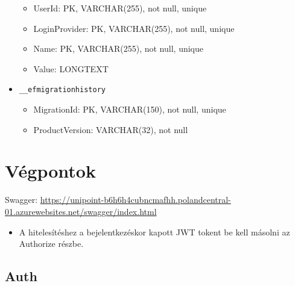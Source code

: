 \documentclass[11pt]{article}
\begin{document}
\begin{itemize}
\begin{itemize}
\item UserId: PK, VARCHAR(255), not null, unique
\item LoginProvider: PK, VARCHAR(255), not null, unique
\item Name: PK, VARCHAR(255), not null, unique
\item Value: LONGTEXT
\end{itemize}
\item \texttt{\_\_efmigrationhistory}
\begin{itemize}
\item MigrationId: PK, VARCHAR(150), not null, unique
\item ProductVersion: VARCHAR(32), not null
\end{itemize}
\end{itemize}
\section{Végpontok}
\label{sec:org38fdb83}
Swagger: \url{https://unipoint-b6h6h4cubncmafhh.polandcentral-01.azurewebsites.net/swagger/index.html}
\begin{itemize}
\item A hitelesítéshez a bejelentkezéskor kapott JWT tokent be kell másolni az Authorize részbe.
\end{itemize}
\subsection{Auth}
\label{sec:org4b2c76f}
\end{document}

